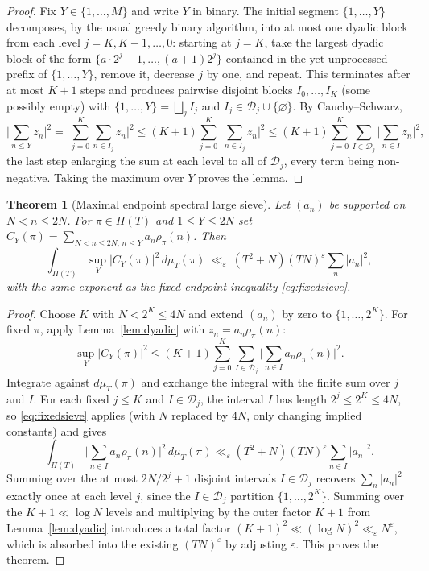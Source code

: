 \documentclass[11pt]{article}
\newtheorem{theorem}{Theorem}[section]
\begin{document}
\begin{proof}
Fix $Y\in\{1,\dots,M\}$ and write $Y$ in binary. The initial segment $\{1,\dots,Y\}$ decomposes, by the
usual greedy binary algorithm, into at most one dyadic block from each level $j=K,K-1,\dots,0$: starting
at $j=K$, take the largest dyadic block of the form $\{a\cdot2^{j}+1,\dots,(a+1)2^{j}\}$ contained in the
yet-unprocessed prefix of $\{1,\dots,Y\}$, remove it, decrease $j$ by one, and repeat. This terminates
after at most $K+1$ steps and produces pairwise disjoint blocks $I_0,\dots,I_K$ (some possibly empty) with
$\{1,\dots,Y\}=\bigsqcup_{j} I_j$ and $I_j\in\mathcal D_j\cup\{\varnothing\}$. By Cauchy--Schwarz,
\[
\Big|\sum_{n\le Y}z_n\Big|^2=\Big|\sum_{j=0}^{K}\sum_{n\in I_j}z_n\Big|^2
\le (K+1)\sum_{j=0}^{K}\Big|\sum_{n\in I_j}z_n\Big|^2
\le (K+1)\sum_{j=0}^{K}\sum_{I\in\mathcal D_j}\Big|\sum_{n\in I}z_n\Big|^2,
\]
the last step enlarging the sum at each level to all of $\mathcal D_j$, every term being non-negative.
Taking the maximum over $Y$ proves the lemma.
\end{proof}

\begin{theorem}[Maximal endpoint spectral large sieve]
\label{thm:maxsieve}
Let $(a_n)$ be supported on $N<n\le 2N$. For $\pi\in\Pi(T)$ and $1\le Y\le 2N$ set
$C_Y(\pi)=\sum_{N<n\le2N,\,n\le Y}a_n\rho_\pi(n)$. Then
\[
\int_{\Pi(T)}\sup_{Y}|C_Y(\pi)|^2\,d\mu_T(\pi)\ \ll_\varepsilon\ (T^2+N)(TN)^\varepsilon\sum_n|a_n|^2,
\]
with the same exponent as the fixed-endpoint inequality \eqref{eq:fixedsieve}.
\end{theorem}

\begin{proof}
Choose $K$ with $N<2^K\le4N$ and extend $(a_n)$ by zero to $\{1,\dots,2^K\}$. For fixed $\pi$, apply
Lemma~\ref{lem:dyadic} with $z_n=a_n\rho_\pi(n)$:
\[
\sup_Y|C_Y(\pi)|^2\le(K+1)\sum_{j=0}^{K}\sum_{I\in\mathcal D_j}\Big|\sum_{n\in I}a_n\rho_\pi(n)\Big|^2.
\]
Integrate against $d\mu_T(\pi)$ and exchange the integral with the finite sum over $j$ and $I$. For each
fixed $j\le K$ and $I\in\mathcal D_j$, the interval $I$ has length $2^j\le 2^K\le4N$, so
\eqref{eq:fixedsieve} applies (with $N$ replaced by $4N$, only changing implied constants) and gives
\[
\int_{\Pi(T)}\Big|\sum_{n\in I}a_n\rho_\pi(n)\Big|^2\,d\mu_T(\pi)\ll_\varepsilon(T^2+N)(TN)^\varepsilon\sum_{n\in I}|a_n|^2.
\]
Summing over the at most $2N/2^j+1$ disjoint intervals $I\in\mathcal D_j$ recovers $\sum_n|a_n|^2$ exactly
once at each level $j$, since the $I\in\mathcal D_j$ partition $\{1,\dots,2^K\}$. Summing over the $K+1\ll
\log N$ levels and multiplying by the outer factor $K+1$ from Lemma~\ref{lem:dyadic} introduces a total
factor $(K+1)^2\ll(\log N)^2\ll_\varepsilon N^\varepsilon$, which is absorbed into the existing
$(TN)^\varepsilon$ by adjusting $\varepsilon$. This proves the theorem.
\end{proof}
\end{document}
